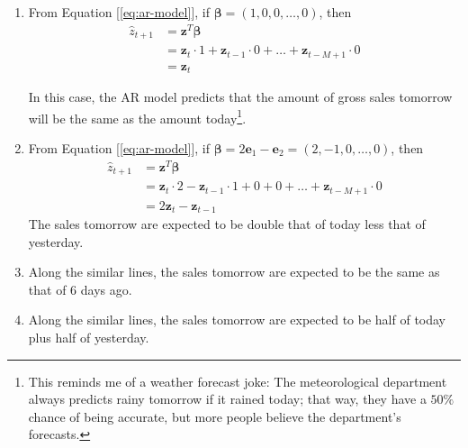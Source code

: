 \documentclass[11pt]{book}
\theoremstyle{definition}
\theoremstyle{plain}
\theoremstyle{problemstyle}
\theoremstyle{remark}
\theoremstyle{definition}
\begin{document}
\begin{enumerate}[label=(\alph*)]
    \item From Equation [\ref{eq:ar-model}], if $\boldsymbol\beta=(1,0,0,\dots,0)$, then 
        \begin{equation*}
            \begin{aligned}
                \hat{z}_{\scriptscriptstyle t+1}&=\boldsymbol{z}^T\boldsymbol\beta\\
                                                &=\boldsymbol{z}_{\scriptscriptstyle t}\cdot 1+\boldsymbol{z}_{\scriptscriptstyle t-1}\cdot 0+\dots+\boldsymbol{z}_{\scriptscriptstyle t-M+1}\cdot 0\\
                                                &=\boldsymbol{z}_t
            \end{aligned}
        \end{equation*}

        In this case, the AR model predicts that the amount of gross sales tomorrow will be the same as the amount today\footnote{This reminds me of a weather forecast joke: The meteorological department always predicts rainy tomorrow if it rained today; that way, they have a $50\%$ chance of being accurate, but more people believe the department's forecasts.}.
    \item From Equation [\ref{eq:ar-model}], if $\boldsymbol\beta=2\boldsymbol{e}_1-\boldsymbol{e}_2=(2,-1  ,0,\dots,0)$, then 
        \begin{equation*}
            \begin{aligned}
                \hat{z}_{\scriptscriptstyle t+1}&=\boldsymbol{z}^T\boldsymbol\beta\\
                                                &=\boldsymbol{z}_{\scriptscriptstyle t}\cdot 2-\boldsymbol{z}_{\scriptscriptstyle t-1}\cdot 1+0+0+\dots+\boldsymbol{z}_{\scriptscriptstyle t-M+1}\cdot 0\\
                                                &=2\boldsymbol{z}_t-\boldsymbol{z}_{\scriptscriptstyle t-1}
            \end{aligned}
        \end{equation*}
        The sales tomorrow are expected to be double that of today less that of yesterday.
    \item Along the similar lines, the sales tomorrow are expected to be the same as that of 6 days ago.
    \item Along the similar lines, the sales tomorrow are expected to be half of today plus half of yesterday.
\end{enumerate}
\end{document}
